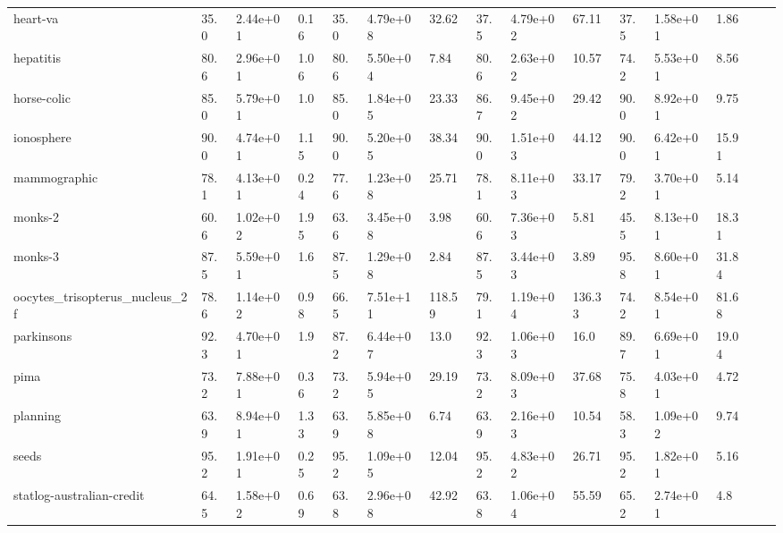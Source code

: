 \begin{table}
\begin{tabular}{lllllllllllllll}
			heart-va                          & 35.0     & 2.44e+01 & 0.16 & 35.0     & 4.79e+08 & 32.62  & 37.5     & 4.79e+02 & 67.11  & 37.5     & 1.58e+01 & 1.86  &   & \\
			hepatitis                         & 80.6     & 2.96e+01 & 1.06 & 80.6     & 5.50e+04 & 7.84   & 80.6     & 2.63e+02 & 10.57  & 74.2     & 5.53e+01 & 8.56  &   & \\
			horse-colic                       & 85.0     & 5.79e+01 & 1.0  & 85.0     & 1.84e+05 & 23.33  & 86.7     & 9.45e+02 & 29.42  & 90.0     & 8.92e+01 & 9.75  &   & \\
			ionosphere                        & 90.0     & 4.74e+01 & 1.15 & 90.0     & 5.20e+05 & 38.34  & 90.0     & 1.51e+03 & 44.12  & 90.0     & 6.42e+01 & 15.91 &   & \\
			mammographic                      & 78.1     & 4.13e+01 & 0.24 & 77.6     & 1.23e+08 & 25.71  & 78.1     & 8.11e+03 & 33.17  & 79.2     & 3.70e+01 & 5.14  &   & \\
			monks-2                           & 60.6     & 1.02e+02 & 1.95 & 63.6     & 3.45e+08 & 3.98   & 60.6     & 7.36e+03 & 5.81   & 45.5     & 8.13e+01 & 18.31 &   & \\
			monks-3                           & 87.5     & 5.59e+01 & 1.6  & 87.5     & 1.29e+08 & 2.84   & 87.5     & 3.44e+03 & 3.89   & 95.8     & 8.60e+01 & 31.84 &   & \\
			oocytes\_trisopterus\_nucleus\_2f & 78.6     & 1.14e+02 & 0.98 & 66.5     & 7.51e+11 & 118.59 & 79.1     & 1.19e+04 & 136.33 & 74.2     & 8.54e+01 & 81.68 &   & \\
			parkinsons                        & 92.3     & 4.70e+01 & 1.9  & 87.2     & 6.44e+07 & 13.0   & 92.3     & 1.06e+03 & 16.0   & 89.7     & 6.69e+01 & 19.04 &   & \\
			pima                              & 73.2     & 7.88e+01 & 0.36 & 73.2     & 5.94e+05 & 29.19  & 73.2     & 8.09e+03 & 37.68  & 75.8     & 4.03e+01 & 4.72  &   & \\
			planning                          & 63.9     & 8.94e+01 & 1.33 & 63.9     & 5.85e+08 & 6.74   & 63.9     & 2.16e+03 & 10.54  & 58.3     & 1.09e+02 & 9.74  &   & \\
			seeds                             & 95.2     & 1.91e+01 & 0.25 & 95.2     & 1.09e+05 & 12.04  & 95.2     & 4.83e+02 & 26.71  & 95.2     & 1.82e+01 & 5.16  &   & \\
			statlog-australian-credit         & 64.5     & 1.58e+02 & 0.69 & 63.8     & 2.96e+08 & 42.92  & 63.8     & 1.06e+04 & 55.59  & 65.2     & 2.74e+01 & 4.8   &   & \\

\end{tabular}
\end{table}
